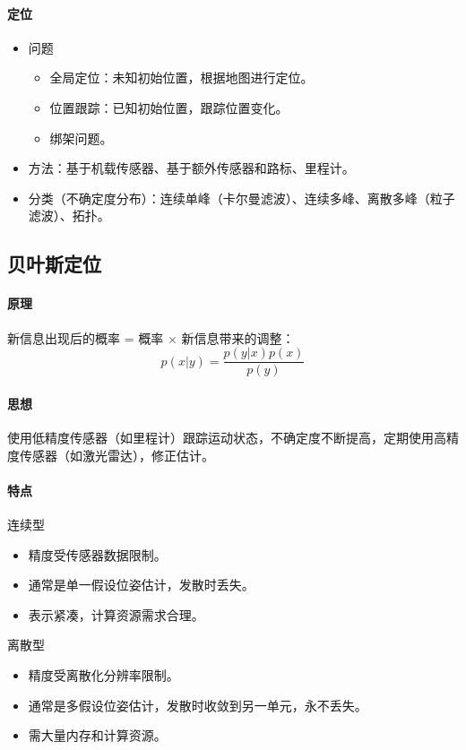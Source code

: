 \documentclass[
12pt, %
a4paper, 
oneside, %
headinclude,footinclude, %
]{scrartcl}
\begin{document}
\paragraph{定位}
\begin{itemize}
\item 问题
\begin{itemize}
\item 全局定位：未知初始位置，根据地图进行定位。
\item 位置跟踪：已知初始位置，跟踪位置变化。
\item 绑架问题。
\end{itemize}
\item 方法：基于机载传感器、基于额外传感器和路标、里程计。
\item 分类（不确定度分布）：连续单峰（卡尔曼滤波）、连续多峰、离散多峰（粒子滤波）、拓扑。
\end{itemize}
\subsection[贝叶斯定位]{贝叶斯定位}
\paragraph{原理}
新信息出现后的概率 = 概率 $ \times $ 新信息带来的调整：
$$ p(x|y) = \frac{p(y|x)p(x)}{p(y)} $$
\paragraph{思想}
使用低精度传感器（如里程计）跟踪运动状态，不确定度不断提高，定期使用高精度传感器（如激光雷达），修正估计。
\paragraph{特点}
\begin{itemize}
\begin{minipage}{0.5\textwidth}
\item 连续型
\begin{itemize}
\item 精度受传感器数据限制。
\item 通常是单一假设位姿估计，发散时丢失。
\item 表示紧凑，计算资源需求合理。
\end{itemize}
\end{minipage}
\begin{minipage}{0.5\textwidth}
\item 离散型
\begin{itemize}
\item 精度受离散化分辨率限制。
\item 通常是多假设位姿估计，发散时收敛到另一单元，永不丢失。
\item 需大量内存和计算资源。
\end{itemize}
\end{minipage}
\end{itemize}
\end{document}
